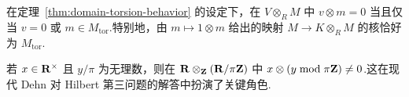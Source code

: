 \begin{corollary}\label{cor:domain-zero-tensor}
在定理~\ref{thm:domain-torsion-behavior} 的设定下，在 $V \otimes_R M$ 中 $v \otimes m = 0$ 当且仅当 $v = 0$ 或 $m \in M_{\mathrm{tor}}$.特别地，由 $m \mapsto 1 \otimes m$ 给出的映射 $M \to K \otimes_R M$ 的核恰好为 $M_{\mathrm{tor}}$.
\end{corollary}

\begin{example}\label{ex:dehn-hilbert}
若 $x \in \mathbf{R}^\times$ 且 $y/\pi$ 为无理数，则在 $\mathbf{R} \otimes_{\mathbf{Z}} (\mathbf{R}/\pi\mathbf{Z})$ 中 $x \otimes (y \bmod \pi\mathbf{Z}) \neq 0$.这在现代 Dehn 对 Hilbert 第三问题的解答中扮演了关键角色.
\end{example}
